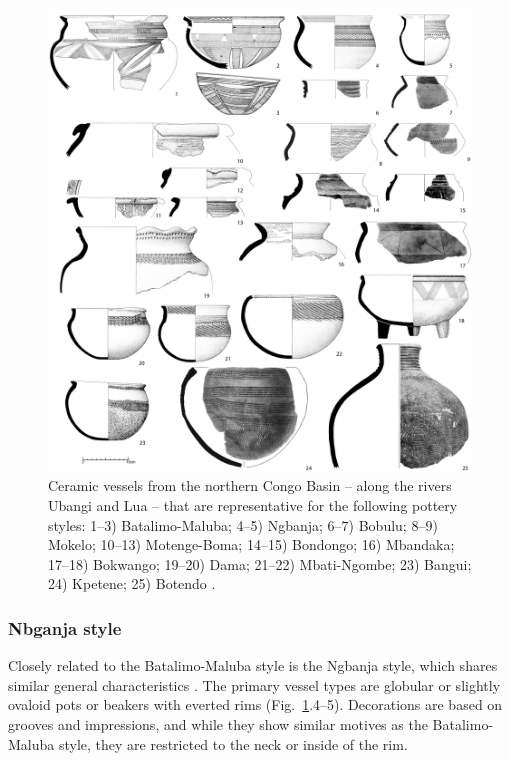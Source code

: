 \documentclass[smallextended,natbib]{svjour3}       %
\begin{document}
\begin{figure}[!tb]
	\includegraphics[width=\textwidth]{Ubangi_Typen.pdf}
	\caption{Ceramic vessels from the northern Congo Basin -- along the rivers Ubangi and Lua -- that are representative for the following pottery styles: 1--3) Batalimo-Maluba; 4--5) Ngbanja; 6--7) Bobulu; 8--9) Mokelo; 10--13) Motenge-Boma; 14--15) Bondongo; 16) Mbandaka; 17--18) Bokwango; 19--20) Dama; 21--22) Mbati-Ngombe; 23) Bangui; 24) Kpetene; 25) Botendo \citep[75--114,172--181]{Seidensticker.2021e}.}
	\label{fig:ubangi}
\end{figure}

\subsubsection*{Nbganja style}

Closely related to the Batalimo-Maluba style is the Ngbanja style, which shares similar general characteristics \citep[82--86]{Seidensticker.2021e}. The primary vessel types are globular or slightly ovaloid pots or beakers with everted rims (Fig.~\ref{fig:ubangi}.4--5). Decorations are based on grooves and impressions, and while they show similar motives as the Batalimo-Maluba style, they are restricted to the neck or inside of the rim.
\end{document}
